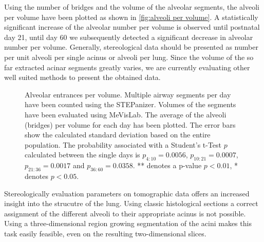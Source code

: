 Using the number of bridges and the volume of the alveolar segments, the alveoli per volume have been plotted as shown in \autoref{fig:alveoli per volume}. A statistically significant increase of the alveolar number per volume is observed until postnatal day 21,  until day 60 we subsequently detected a significant decrease in alveolar number per volume. Generally, stereological data should be presented as number per unit \eg alveoli per single acinus or alveoli per lung. Since the volume of the so far extracted acinar segments greatly varies, we are currently evaluating other well suited methods to present the obtained data.

\begin{figure}
	\centering
	\caption[Alveolar entrances per volume]{Alveolar entrances per volume. Multiple airway segments per day have been counted using the STEPanizer. Volumes of the segments have been evaluated using MeVisLab. The average of the alveoli (bridges) per volume for each day has been plotted. The error bars show the calculated standard deviation based on the entire population. The probability associated with a Student's t-Test $p$ calculated between the single days is $p_{4:10}=0.0056$, $p_{10:21}=0.0007$, $p_{21:36}=0.0017$ and $p_{36:60}=0.0358$. ** denotes a p-value $p<0.01$, * denotes $p<0.05$.}
	\label{fig:alveoli per volume plot}
\end{figure}

Stereologically evaluation parameters on tomographic data offers an increased insight into the strucutre of the lung. Using classic histological sections a correct assignment of the different alveoli to their appropriate acinus is not possible. Using a three-dimensional region growing segmentation of the acini makes this task easily feasible, even on the resulting two-dimensional slices.